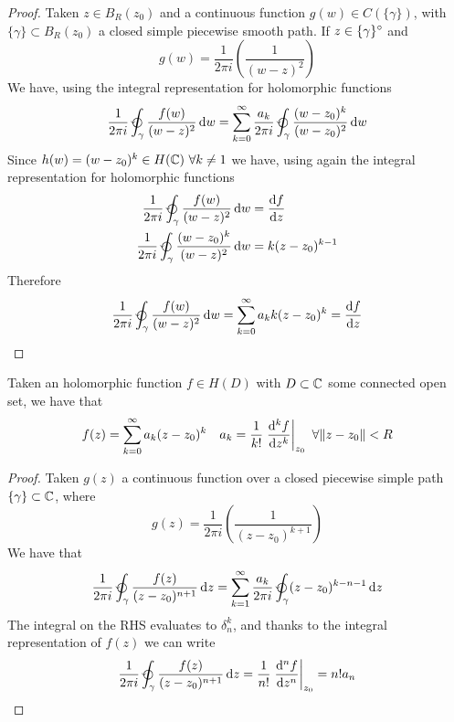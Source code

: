 \documentclass[../complete.tex]{subfiles}
\begin{document}
\begin{proof}
	Taken $z\in B_R(z_0)$ and a continuous function $g(w)\in C(\{\gamma\})$, with $\{\gamma\}\subset B_R(z_0)$ a closed simple piecewise smooth path. If $z\in\{\gamma\}^{\circ}$ and
	\begin{equation*}
		g(w)=\frac{1}{2\pi i}\left( \frac{1}{(w-z)^2} \right)
	\end{equation*}
	We have, using the integral representation for holomorphic functions
	\begin{equation*}
		\frac{1}{2\pi i}\ointccw_{\gamma}\frac{f(w)}{(w-z)^2}\diff w=\sum_{k=0}^\infty\frac{a_k}{2\pi i}\ointccw_{\gamma}\frac{(w-z_0)^k}{(w-z_0)^2}\diff w
	\end{equation*}
	Since $h(w)=(w-z_0)^k\in H(\mathbb{C})\ \forall k\ne1$ we have, using again the integral representation for holomorphic functions
	\begin{equation*}
		\begin{aligned}
			\frac{1}{2\pi i}\ointccw_\gamma\frac{f(w)}{(w-z)^2}\diff w&=\derivative{f}{z}\\
			\frac{1}{2\pi i}\ointccw_\gamma\frac{(w-z_0)^k}{(w-z)^2}\diff w&=k(z-z_0)^{k-1}
		\end{aligned}
	\end{equation*}
	Therefore
	\begin{equation*}
		\frac{1}{2\pi i}\ointccw_\gamma\frac{f(w)}{(w-z)^2}\diff{w}=\sum_{k=0}^\infty a_kk(z-z_0)^k=\derivative{f}{z}
	\end{equation*}
\end{proof}
\begin{cor}
	Taken an holomorphic function $f\in H(D)$ with $D\subset\mathbb{C}$ some connected open set, we have that
	\begin{equation*}
		f(z)=\sum_{k=0}^{\infty}a_k(z-z_0)^k\quad a_k=\frac{1}{k!}\left.\derivative[k]{f}{z}\right|_{z_0}\ \forall\norm{z-z_0}<R
	\end{equation*}
\end{cor}
\begin{proof}
	Taken $g(z)$ a continuous function over a closed piecewise simple path $\{\gamma\}\subset\mathbb{C}$, where
	\begin{equation*}
		g(z)=\frac{1}{2\pi i}\left( \frac{1}{(z-z_0)^{k+1}} \right)
	\end{equation*}
	We have that
	\begin{equation*}
		\frac{1}{2\pi i}\ointccw_\gamma\frac{f(z)}{(z-z_0)^{n+1}}\diff z=\sum_{k=1}^{\infty}\frac{a_k}{2\pi i}\ointccw_\gamma(z-z_0)^{k-n-1}\diff z
	\end{equation*}
	The integral on the RHS evaluates to $\delta^k_n$, and thanks to the integral representation of $f(z)$ we can write
	\begin{equation*}
		\frac{1}{2\pi i}\ointccw_\gamma\frac{f(z)}{(z-z_0)^{n+1}}\diff z=\frac{1}{n!}\left.\derivative[n]{f}{z}\right|_{z_0}=n!a_n
	\end{equation*}
\end{proof}
\end{document}
